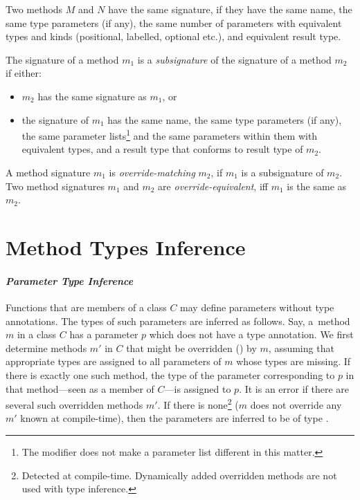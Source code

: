Two methods $M$ and $N$ have the same signature, if they have the same name, the same type parameters (if any), the same number of parameters with equivalent types and kinds (positional, labelled, optional etc.), and equivalent result type. 

The signature of a method $m_1$ is a {\em subsignature} of the signature of a method $m_2$ if either:
\begin{itemize}
  \item $m_2$ has the same signature as $m_1$, or
  \item the signature of $m_1$ has the same name, the same type parameters (if any), the same parameter lists\footnote{The  modifier does not make a parameter list different in this matter.} and the same parameters within them with equivalent types, and a result type that conforms to result type of $m_2$. 
\end{itemize}

A method signature $m_1$ is {\em override-matching} $m_2$, if $m_1$ is a subsignature of $m_2$. Two method signatures $m_1$ and $m_2$ are {\em override-equivalent}, iff $m_1$ is the same as $m_2$. 





\section{Method Types Inference}
\label{sec:method-types-inference}

\paragraph{\em Parameter Type Inference}
Functions that are members of a class $C$ may define parameters without type annotations. The types of such parameters are inferred as follows. Say, a~method $m$ in a class $C$ has a parameter $p$ which does not have a type annotation. We first determine methods $m'$ in $C$ that might be overridden () by $m$, assuming that appropriate types are assigned to all parameters of $m$ whose types are missing. If there is exactly one such method, the type of the parameter corresponding to $p$ in that method---seen as a member of $C$---is assigned to $p$. It is an error if there are several such overridden methods $m'$. If there is none\footnote{Detected at compile-time. Dynamically added overridden methods are not used with type inference.} ($m$ does not override any $m'$ known at compile-time), then the parameters are inferred to be of type .

